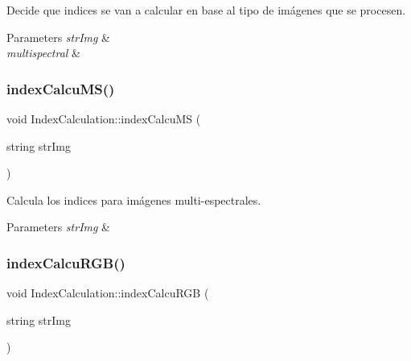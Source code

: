 Decide que indices se van a calcular en base al tipo de imágenes que se procesen. 


\begin{DoxyParams}{Parameters}
{\em str\+Img} & \\
\hline
{\em multispectral} & \\
\hline
\end{DoxyParams}
\mbox{\label{classIndexCalculation_a9c19fb3bdd84afb8769c90a1e31857b3}} 
\subsubsection{\texorpdfstring{index\+Calcu\+M\+S()}{indexCalcuMS()}}
{\footnotesize\ttfamily void Index\+Calculation\+::index\+Calcu\+MS (\begin{DoxyParamCaption}\item[{string}]{str\+Img }\end{DoxyParamCaption})\hspace{0.3cm}{\ttfamily [inline]}}



Calcula los indices para imágenes multi-\/espectrales. 


\begin{DoxyParams}{Parameters}
{\em str\+Img} & \\
\hline
\end{DoxyParams}
\mbox{\label{classIndexCalculation_a7070ce3aebd8abd71074270eff8f88b6}} 
\subsubsection{\texorpdfstring{index\+Calcu\+R\+G\+B()}{indexCalcuRGB()}}
{\footnotesize\ttfamily void Index\+Calculation\+::index\+Calcu\+R\+GB (\begin{DoxyParamCaption}\item[{string}]{str\+Img }\end{DoxyParamCaption})\hspace{0.3cm}{\ttfamily [inline]}}



